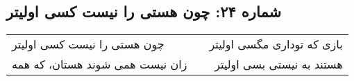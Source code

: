 \begin{center}
\section*{شماره ۲۴: چون هستی را نیست کسی اولیتر}
\label{sec:024}
\begin{longtable}{l p{0.5cm} r}
چون هستی را نیست کسی اولیتر
&&
بازی که توداری مگسی اولیتر
\\
زان نیست همی شوند هستان، که همه
&&
هستند به نیستی بسی اولیتر
\\
\end{longtable}
\end{center}
